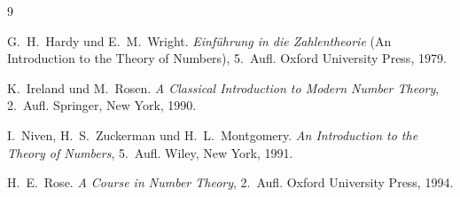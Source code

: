 \documentclass[12pt,a4paper]{amsart}
\theoremstyle{definition}
\begin{document}
\begin{thebibliography}{9}

G.~H.~Hardy und E.~M.~Wright.
\newblock \emph{Einführung in die Zahlentheorie} (An Introduction to the Theory of Numbers), 5.~Aufl.
\newblock Oxford University Press, 1979.

K.~Ireland und M.~Rosen.
\newblock \emph{A Classical Introduction to Modern Number Theory}, 2.~Aufl.
\newblock Springer, New York, 1990.

I.~Niven, H.~S.~Zuckerman und H.~L.~Montgomery.
\newblock \emph{An Introduction to the Theory of Numbers}, 5.~Aufl.
\newblock Wiley, New York, 1991.

H.~E.~Rose.
\newblock \emph{A Course in Number Theory}, 2.~Aufl.
\newblock Oxford University Press, 1994.

\end{thebibliography}
\end{document}
